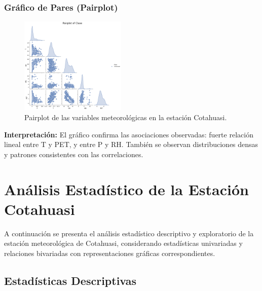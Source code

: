 \subsubsection*{Gráfico de Pares (Pairplot)}
\begin{figure}[H]
\centering
\includegraphics[width=0.45\textwidth]{resultados/por_estacion_meteorologica/Cotahuasi/pairplot.png}
\caption{Pairplot de las variables meteorológicas en la estación Cotahuasi.}
\label{fig:cotahuasi_pairplot}
\end{figure}
\textbf{Interpretación:} El gráfico confirma las asociaciones observadas: fuerte relación lineal entre T y PET, y entre P y RH. También se observan distribuciones densas y patrones consistentes con las correlaciones.




\section{Análisis Estadístico de la Estación Cotahuasi}

A continuación se presenta el análisis estadístico descriptivo y exploratorio de la estación meteorológica de Cotahuasi, considerando estadísticas univariadas y relaciones bivariadas con representaciones gráficas correspondientes.

\subsection{Estadísticas Descriptivas}

